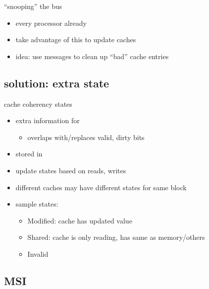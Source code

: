 \begin{frame}{``snooping'' the bus}
\begin{itemize}
\item every processor already 
\item take advantage of this to update caches
\item idea: use messages to clean up ``bad'' cache entries
\end{itemize}
\end{frame}

\subsection{solution: extra state}

\begin{frame}{cache coherency states}
\begin{itemize}
\item extra information for 
    \begin{itemize}
        \item overlaps with/replaces valid, dirty bits
    \end{itemize}
\item stored in 
\item update states based on reads, writes 
\item different caches may have different states for same block
\vspace{.5cm}
\item<2-> sample states:
    \begin{itemize}
    \item Modified: cache has updated value
    \item Shared: cache is only reading, has same as memory/others
    \item Invalid
    \end{itemize}
\end{itemize}
\end{frame}

\subsection{MSI}

